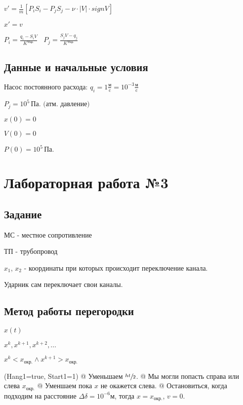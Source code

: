 \documentclass[12pt, a4paper]{article}
\begin{document}
$ v' = \frac{1}{m}[P_i S_i - P_j S_j - \nu \cdot |V| \cdot sign V] $

$ x' = v $

$ P_i = \frac{q_i - S_i V}{K^{\text{Упр.}}} \> \> \> \> P_j = \frac{S_j V - q_j}{K^{\text{Упр.}}}$


\subsection{Данные и начальные условия}

$\text{Насос постоянного расхода: } q_i = 1 \frac{\text{м}}{\text{c}} = 10^{-3} \frac{\text{м}}{\text{c}}$

$P_j = 10^5\, \text{Па. (атм. давление)}$

$ x(0) = 0$

$ V(0) = 0$

$ P(0) = 10^5\, \text{Па.} $


\section{Лабораторная работа №3}

\subsection{Задание}

МС - местное сопротивление

ТП - трубопровод

$x_1$, $x_2$ - координаты при которых происходит переключение канала.

Ударник сам переключает свои каналы.


\subsection{Метод работы перегородки}

$ x(t) $

$ x^k, x^{k+1}, x^{k+2}, \dots $

$ x^k < x_\text{окр.} \wedge x^{k+1} > x_\text{окр.} $

\noindent\begin{easylist}
\ListProperties(Hang1=true, Start1=1)
@ Уменьшаем $\sfrac{ht}{2}$.
@ Мы могли попасть справа или слева $x_\text{окр.}$
@ Уменшаем пока $x$ не окажется слева.
@ Остановиться, когда подходим на расстояние $\Delta\delta = 10^{-6} \text{м}$, тогда $x = x_{\text{окр.}}$, $v = 0$.
\end{easylist}
\end{document}
